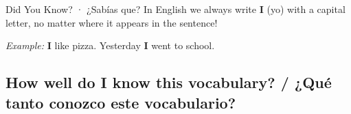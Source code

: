 \vspace{14pt}

\begin{grammartip}{Did You Know? · ¿Sabías que?}
In English we always write \textbf{I} (yo) with a capital letter, no matter where it appears in the sentence!

\medskip
\textit{Example:} \textbf{I} like pizza. \quad Yesterday \textbf{I} went to school.
\end{grammartip}

\vspace{10pt}

\subsection*{How well do I know this vocabulary? / ¿Qué tanto conozco este vocabulario?}
\selfcheck[2]
